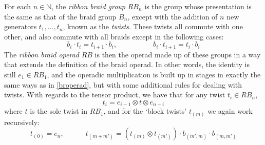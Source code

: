 \documentclass{amsbook} %
\numberwithin{section}{chapter}
\begin{document}
\begin{Defi} For each $n \in \mathbb{N}$, the \emph{ribbon braid group} $RB_{n}$ is the group whose presentation is the same as that of the braid group $B_{n}$, except with the addition of $n$ new generators $t_1, ..., t_n$, known as the \emph{twists}. These twists all commute with one other, and also commute with all braids except in the following cases:
\[ b_i \cdot t_i = t_{i+1} \cdot b_i, \quad \quad \quad \quad \quad b_i \cdot t_{i+1} = t_i \cdot b_i \]
The \emph{ribbon braid operad} $RB$ is then the operad made up of these groups in a way that extends the definition of the braid operad. In other words, the identity is still $e_1 \in RB_1$, and the operadic multiplication is built up in stages in exactly the same ways as in \cref{broperad}, but with some additional rules for dealing with twists. With regards to the tensor product, we have that for any twist $t_i \in RB_{n}$,
\[ t_i = e_{i-1} \otimes t \otimes e_{n-i} \]
where $t$ is the sole twist in $RB_1$, and for the `block twists' $t_{(m)}$ we again work recursively:
\[ t_{(0)} = e_n, \quad \quad \quad t_{(m+m')} = (t_{(m)} \otimes t_{(m')}) \cdot b_{(m', m)} \cdot b_{(m, m')} \]
\end{Defi}
\end{document}
